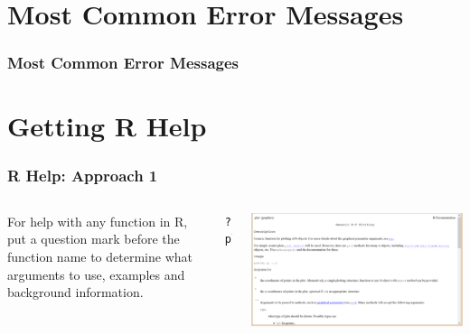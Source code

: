 \section[Error Messages]{Most Common Error Messages}

\begin{frame}
  \frametitle{Most Common Error Messages}

\end{frame}

\section[Help]{Getting R Help}

\begin{frame}[fragile]
\frametitle{R Help: Approach 1}

  \begin{columns}
  For help with any function in R, put a question mark before the function name to determine what arguments to use, examples and background information.

  \begin{lstlisting}
?plot
  \end{lstlisting}

    \begin{center}
    \includegraphics[width=1.1\textwidth]{images/Rhelp}
    \end{center}
  \end{columns}

\end{frame}

